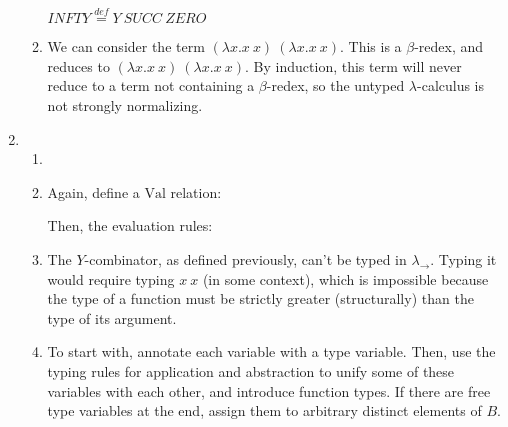 \documentclass{article}
\newcommand{\defeq}{\overset{\mathit{def}}{=}}
\begin{document}
\begin{enumerate}
\begin{enumerate}
    $INFTY \defeq Y~SUCC~ZERO$
  \item
    We can consider the term $(\lambda x.x~x)~(\lambda x.x~x)$. This is a $\beta$-redex, and reduces to $(\lambda x.x~x)~(\lambda x.x~x)$. By induction, this term will never reduce to a term not containing a $\beta$-redex, so the untyped $\lambda$-calculus is not strongly normalizing.
  \end{enumerate}

\item
  \begin{enumerate}
  \item
  \item
    Again, define a $\mathrm{Val}$ relation:
    Then, the evaluation rules:
  \item
    The $Y$-combinator, as defined previously, can't be typed in $\lambda_\to$. Typing it would require typing $x~x$ (in some context), which is impossible because the type of a function must be strictly greater (structurally) than the type of its argument.
  \item To start with, annotate each variable with a type variable. Then, use the typing rules for application and abstraction to unify some of these variables with each other, and introduce function types. If there are free type variables at the end, assign them to arbitrary distinct elements of $B$.
  \end{enumerate}
\end{enumerate}
\end{document}
